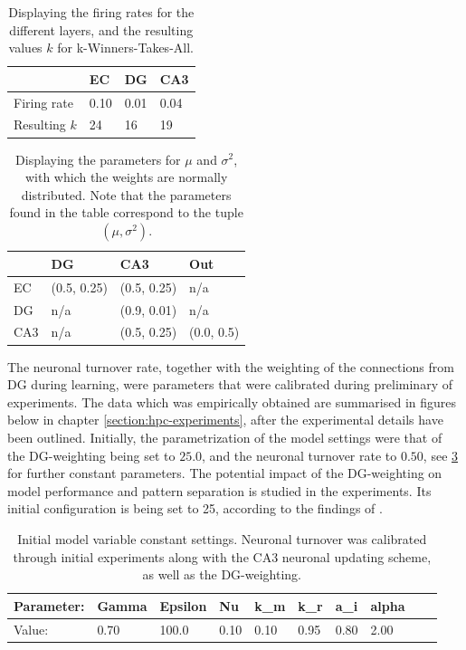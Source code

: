 \begin{table}
\centering
\caption{Displaying the firing rates for the different layers, and the resulting values $k$ for k-Winners-Takes-All.}
\label{table:firing_rates}
\begin{tabular}{l|l|l|l|}
\cline{2-4}
                                  & EC   & DG   & CA3  \\ \hline
\multicolumn{1}{|l|}{Firing rate} & 0.10 & 0.01 & 0.04 \\ \hline
\multicolumn{1}{|l|}{Resulting $k$} & 24 & 16 & 19 \\ \hline
\end{tabular}
\end{table}

\begin{table}[]
\centering
\caption{Displaying the parameters for $\mu$ and $\sigma^2$, with which the weights are normally distributed. Note that the parameters found in the table correspond to the tuple $(\mu, \sigma^2)$.}
\label{table:initial_weight_distributions}
\begin{tabular}{l|l|l|l|}
\cline{2-4}
                          & DG        & CA3       & Out      \\ \hline
\multicolumn{1}{|l|}{EC}  & (0.5, 0.25) & (0.5, 0.25) & n/a      \\ \hline
\multicolumn{1}{|l|}{DG}  & n/a       & (0.9, 0.01) & n/a      \\ \hline
\multicolumn{1}{|l|}{CA3} & n/a       & (0.5, 0.25) & (0.0, 0.5) \\ \hline
\end{tabular}
\end{table}

The neuronal turnover rate, together with the weighting of the connections from DG during learning, were parameters that were calibrated during preliminary of experiments. The data which was empirically obtained are summarised in figures below in chapter \ref{section:hpc-experiments}, after the experimental details have been outlined. Initially, the parametrization of the model settings were that of the DG-weighting being set to $25.0$, and the neuronal turnover rate to $0.50$, see \ref{table:initial_settings} for further constant parameters. The potential impact of the DG-weighting on model performance and pattern separation is studied in the experiments. Its initial configuration is being set to 25, according to the findings of \citep{Wakagi2008}.

\begin{table}
\centering
\caption{Initial model variable constant settings. Neuronal turnover was calibrated through initial experiments along with the CA3 neuronal updating scheme, as well as the DG-weighting.}
\label{table:initial_settings}
\begin{tabular}{|l|l|l|l|l|l|l|l|l|l|}
\cline{1-8}
Parameter: & Gamma & Epsilon & Nu   & k\_m & k\_r & a\_i & alpha \\ \hline
Value:     & 0.70  & 100.0   & 0.10 & 0.10 & 0.95 & 0.80 & 2.00 \\ \hline
\end{tabular}
\end{table}

